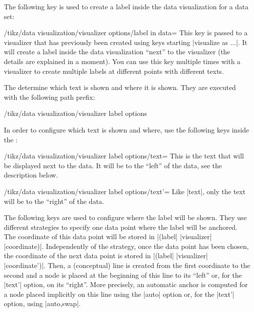 The following key is used to create a label inside the data visualization for a
data set:

\begin{key}{/tikz/data visualization/visualizer options/label in data=}
    This key is passed to a visualizer that has previously been created using
    keys starting |visualize as ...|. It will create a label inside the data
    visualization ``next'' to the visualizer (the details are explained in a
    moment). You can use this key multiple times with a visualizer to create
    multiple labels at different points with different texts.

    The  determine which text is shown and where it is shown.
    They are executed with the following path prefix:
\begin{codeexample}
/tikz/data visualization/visualizer label options
\end{codeexample}

    In order to configure which text is shown and where, use the following keys
    inside the :

    \begin{key}{/tikz/data visualization/visualizer label options/text=}
        This is the text that will be displayed next to the data. It will be to
        the ``left'' of the data, see the description below.
    \end{key}
    \begin{key}{/tikz/data visualization/visualizer label options/text'=}
        Like |text|, only the text will be to the ``right'' of the data.
    \end{key}

    The following keys are used to configure where the label will be shown.
    They use different strategies to specify one data point where the label
    will be anchored. The coordinate of this data point will be stored in
    |(label| |visualizer| |coordinate)|. Independently of the strategy, once
    the data point has been chosen, the coordinate of the next data point is
    stored in |(label| |visualizer| |coordinate')|. Then, a (conceptual) line
    is created from the first coordinate to the second and a node is placed at
    the beginning of this line to its ``left'' or, for the |text'| option, on
    its ``right''. More precisely, an automatic anchor is computed for a node
    placed implicitly on this line using the |auto| option or, for the |text'|
    option, using |auto,swap|.


\end{key}
